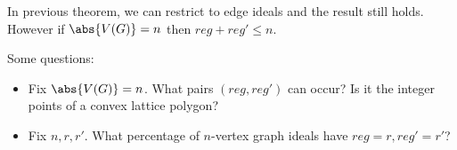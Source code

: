 \begin{theorem}
    In previous theorem, we can restrict to edge ideals and the result still holds. However if $\abs{V(G)} = n$ then $reg + reg' \leq n$.
\end{theorem}

\begin{remark}
    Some questions:
    \begin{itemize}
        \item Fix $\abs{V(G) } = n$. What pairs $(reg, reg')$ can occur? Is it the integer points of a convex lattice polygon?
        \item Fix $n,r,r'$. What percentage of $n$-vertex graph ideals have $reg = r, reg' = r'$?
    \end{itemize}
\end{remark}
